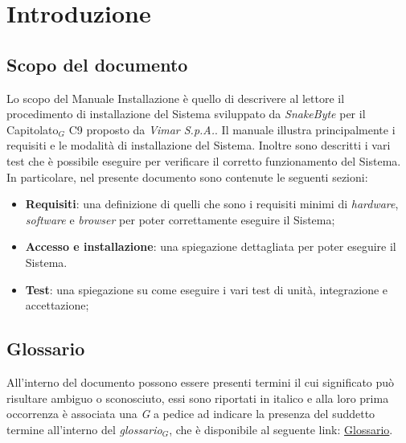 \documentclass[10pt, letterpaper]{article}
\begin{document}
\makeTitlePage

\newpage 
{}
\makeChangelog

\newpage
\setcounter{tocdepth}{3}
\tableofcontents

\newpage



\section{Introduzione}

\subsection{Scopo del documento}
Lo scopo del Manuale Installazione è quello di descrivere al lettore il procedimento di installazione del Sistema sviluppato da \textit{SnakeByte} per il Capitolato${_G}$ C9 proposto da \textit{Vimar S.p.A.}.
Il manuale illustra principalmente i requisiti e le modalità di installazione del Sistema. Inoltre sono descritti i vari test che è possibile eseguire per verificare il corretto funzionamento del Sistema.
\\In particolare, nel presente documento sono contenute le seguenti sezioni:
\begin{itemize}
      \item \textbf{Requisiti}: una definizione di quelli che sono i requisiti minimi di \textit{hardware}, \textit{software} e \textit{browser} per poter correttamente eseguire il Sistema;
      \item \textbf{Accesso e installazione}: una spiegazione dettagliata per poter eseguire il Sistema.
      \item \textbf{Test}: una spiegazione su come eseguire i vari test di unità, integrazione e accettazione;
\end{itemize}

\subsection{Glossario}
All'interno del documento possono essere presenti termini il cui significato può risultare ambiguo o sconosciuto, essi sono
riportati in italico e alla loro prima occorrenza è associata una \textit{G} a pedice ad indicare la presenza del suddetto termine 
all'interno del \texorpdfstring{\textit{glossario}}{glossario}$_G$, che è disponibile al seguente link: \href{https://snakebyteteam.github.io/glossary.html}{Glossario}.
\end{document}
